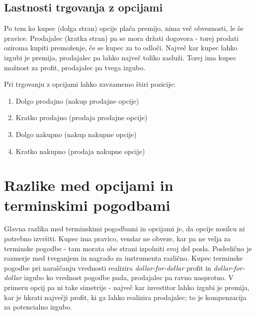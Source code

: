 \documentclass[a4paper]{article}
\begin{document}
\subsection{Lastnosti trgovanja z opcijami}
Po tem ko kupec (dolga stran) opcije plača premijo, nima več obveznosti, le še pravice. Prodajalec (kratka stran) pa se mora držati dogovora - torej prodati
oziroma kupiti premoženje, če se kupec za to odloči. Največ kar kupec lahko izgubi je premija,
prodajalec pa lahko največ toliko zasluži. Torej ima kupec možnost za profit, prodajalec pa tvega izgubo.

Pri trgovanju z opcijami lahko zavzamemo štiri pozicije:
\begin{enumerate}
    \item Dolgo prodajno (nakup prodajne opcije)
    \item Kratko prodajno (prodaja prodajne opcije)
    \item Dolgo nakupno (nakup nakupne opcije)
    \item Kratko nakupno (prodaja nakupne opcije)
\end{enumerate}

\section{Razlike med opcijami in terminskimi pogodbami}
Glavna razlika med terminskimi pogodbami in opcijami je, da opcije nosilcu ni potrebno izvršiti. Kupec ima pravico,
vendar ne obveze, kar pa ne velja za terminske pogodbe - tam morata obe strani izpolniti svoj del posla.
Posledično je razmerje med tveganjem in nagrado za instrumenta različno. Kupec terminske pogodbe pri naraščanju vrednosti
realizira \textit{dollar-for-dollar} profit in \textit{dollar-for-dollar} izgubo ko vrednost pogodbe pada, prodajalec pa ravno nasprotno. V primeru
opcij pa ni take simetrije - največ kar investitor lahko izgubi je premija, kar je hkrati največji profit, ki ga lahko realizira prodajalec;
to je kompenzacija za potencialno izgubo.
\end{document}

